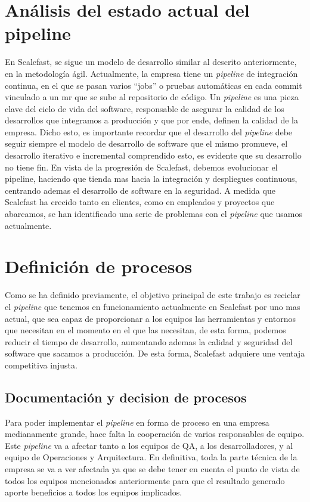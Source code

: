 \documentclass[12pt]{report} %
\begin{document}
\section{Análisis del estado actual del pipeline} %

En Scalefast, se sigue un modelo de desarrollo similar al descrito anteriormente, en la metodología ágil.
Actualmente, la empresa tiene un \textit{\gls{pipeline}} de integración continua, en el que se pasan varios ``jobs'' o pruebas automáticas en cada commit vinculado a un \acrfull{mr} que se sube al repositorio de código.
Un \textit{\gls{pipeline}} es una pieza clave del ciclo de vida del software, responsable de asegurar la calidad de los desarrollos que integramos a producción y que por ende, definen la calidad de la empresa.
Dicho esto, es importante recordar que el desarrollo del \textit{\gls{pipeline}} debe seguir siempre el modelo de desarrollo de software que el mismo promueve, el desarrollo iterativo e incremental comprendido esto, es evidente que su desarrollo no tiene fin.
En vista de la progresión de Scalefast, debemos evolucionar el pipeline, haciendo que tienda mas hacia la integración y despliegues continuous, centrando ademas el desarrollo de software en la seguridad.
A medida que Scalefast ha crecido tanto en clientes, como en empleados y proyectos que abarcamos, se han identificado una serie de problemas con el \textit{\gls{pipeline}} que usamos actualmente.

\section{Definición de procesos}

Como se ha definido previamente, el objetivo principal de este trabajo es reciclar el \textit{\gls{pipeline}} que tenemos en funcionamiento actualmente en Scalefast por uno mas actual, que sea capaz de proporcionar a los equipos las herramientas y entornos que necesitan en el momento en el que las necesitan, de esta forma, podemos reducir el tiempo de desarrollo, aumentando ademas la calidad y seguridad del software que sacamos a producción.
De esta forma, Scalefast adquiere une ventaja competitiva injusta.

\subsection{Documentación y decision de procesos}

Para poder implementar el \textit{\gls{pipeline}} en forma de proceso en una empresa medianamente grande, hace falta la cooperación de varios responsables de equipo.
Este \textit{\gls{pipeline}} va a afectar tanto a los equipos de QA, a los desarrolladores, y al equipo de Operaciones y Arquitectura.
En definitiva, toda la parte técnica de la empresa se va a ver afectada ya que se debe tener en cuenta el punto de vista de todos los equipos mencionados anteriormente para que el resultado generado aporte beneficios a todos los equipos implicados.
\end{document}
